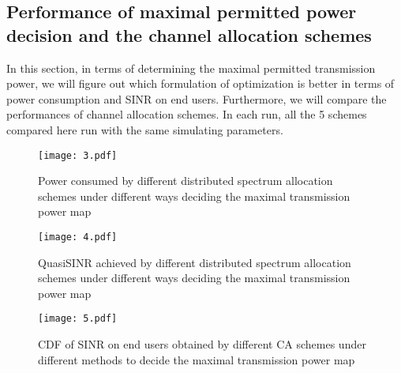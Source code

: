\subsection{Performance of maximal permitted power decision and the channel allocation schemes}
In this section, in terms of determining the maximal permitted transmission power, we will figure out which formulation of optimization is better in terms of power consumption and SINR on end users.
Furthermore, we will compare the performances of channel allocation schemes.
In each run, all the 5 schemes compared here run with the same simulating parameters.
 \begin{figure}[h!]
    \centering
      \texttt{[image: 3.pdf]}
    \caption{Power consumed by different distributed spectrum allocation schemes under different ways deciding the maximal transmission power map}
\label{sim:group1_power}    
  \end{figure}
  
   \begin{figure}[h!]
       \centering
       \texttt{[image: 4.pdf]}
       \caption{QuasiSINR achieved by different distributed spectrum allocation schemes under different ways deciding the maximal transmission power map}
	\label{sim:group1_qsinr}       
     \end{figure}
  
 
  \begin{figure}[h!]
     \centering
     \texttt{[image: 5.pdf]}
     \caption{CDF of SINR on end users obtained by different CA schemes under different methods to decide the maximal transmission power map}
\label{group1_sinr}     
   \end{figure}

